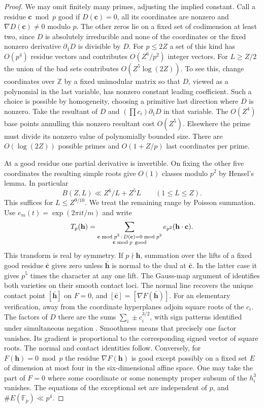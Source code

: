\documentclass[11pt,letterpaper]{article}
\theoremstyle{definition}
\begin{document}
\begin{proof}
We may omit finitely many primes, adjusting the implied constant.
Call a residue $\mathbf c\bmod p$ good if $D(\mathbf c)=0$, all its
coordinates are nonzero and $\nabla D(\mathbf c)\ne0$ modulo $p$.
The other zeros lie on a fixed set of codimension at least two, since
$D$ is absolutely irreducible and none of the coordinates or the fixed
nonzero derivative $\partial_1D$ is divisible by $D$.
For $p\le 2Z$ a set of this kind has $O(p^4)$ residue vectors and contributes
$O(Z^6/p^2)$ integer vectors. For $L\ge Z/2$ the union of the bad sets
contributes $O(Z^5\log(2Z))$. To see this, change coordinates over
$\mathbb Z$ by a fixed unimodular matrix so that $D$, viewed as a polynomial
in the last variable, has nonzero constant leading coefficient. Such a
choice is possible by homogeneity, choosing a primitive last direction
where $D$ is nonzero. Take the resultant of $D$ and
$(\prod c_i)\partial_1D$ in that variable. The $O(Z^4)$ base points
annulling this nonzero resultant cost $O(Z^5)$. Elsewhere the prime
must divide its nonzero value of polynomially bounded size. There are
$O(\log(2Z))$ possible primes and $O(1+Z/p)$ last coordinates per prime.

At a good residue one partial derivative is invertible. On fixing the
other five coordinates the resulting simple roots give $O(1)$ classes
modulo $p^2$ by Hensel's lemma. In particular
\[
 B(Z,L)\ll Z^6/L+Z^5L\qquad(1\le L\le Z).
\]
This suffices for $L\le Z^{9/10}$. We treat the remaining range by Poisson
summation. Use $e_m(t)=\exp(2\pi i t/m)$ and write
\[
 T_p(\mathbf h)=\sum_{\substack{\mathbf c\bmod p^2\, :\,D(\mathbf c)=0\bmod p^2\\
                      \mathbf c\bmod p\ {\rm good}}}
                        e_{p^2}(\mathbf h\cdot\mathbf c).
\]
This transform is real by symmetry. If $p\nmid\mathbf h$, summation over
the lifts of a fixed good residue $\bar{\mathbf c}$ gives zero unless
$\bar{\mathbf h}$ is normal to the dual at $\bar{\mathbf c}$. In the
latter case it gives $p^5$ times the character at any one lift. The Gauss-map argument of \cite[proof of Proposition 9.11]{c3:wang} identifies both varieties on their smooth contact loci. The normal
line recovers the unique contact point $[\bar{\mathbf h}]$ on $F=0$,
and $[\bar{\mathbf c}]=[\nabla F(\bar{\mathbf h})]$.
For an elementary verification, away from the coordinate hyperplanes
adjoin square roots of the $c_i$. The factors of $D$ there are the sums
$\sum_i\pm c_i^{3/2}$, with sign patterns identified under simultaneous
negation \cite[Sect.~1]{c3:wang}. Smoothness means that precisely one factor
vanishes. Its gradient is proportional to the corresponding signed vector
of square roots. The normal and contact identities follow. Conversely,
for $F(\mathbf h)=0\bmod p$ the residue $\nabla F(\mathbf h)$ is good
except possibly on a fixed set $E$ of dimension at most four in the
six-dimensional affine space. One may take the part of $F=0$ where some
coordinate or some nonempty proper subsum of the $h_i^3$ vanishes. The
equations of the exceptional set are independent of $p$, and
$\#E(\mathbb F_p)\ll p^4$.


\end{proof}
\end{document}
